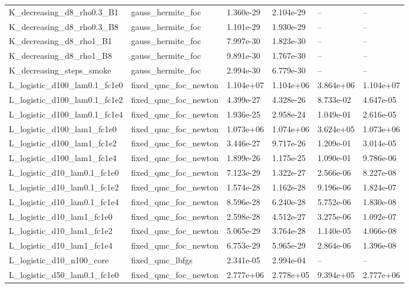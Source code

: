 \begin{tabular}{llllll}
K\_decreasing\_d8\_rho0.3\_B1 & gauss\_hermite\_foc & 1.360e-29 & 2.104e-29 & -- & -- \\
K\_decreasing\_d8\_rho0.3\_B8 & gauss\_hermite\_foc & 1.101e-29 & 1.930e-29 & -- & -- \\
K\_decreasing\_d8\_rho1\_B1 & gauss\_hermite\_foc & 7.997e-30 & 1.823e-30 & -- & -- \\
K\_decreasing\_d8\_rho1\_B8 & gauss\_hermite\_foc & 9.891e-30 & 1.767e-30 & -- & -- \\
K\_decreasing\_steps\_smoke & gauss\_hermite\_foc & 2.994e-30 & 6.779e-30 & -- & -- \\
L\_logistic\_d100\_lam0.1\_fc1e0 & fixed\_qmc\_foc\_newton & 1.104e+07 & 1.104e+06 & 3.864e+06 & 1.104e+07 \\
L\_logistic\_d100\_lam0.1\_fc1e2 & fixed\_qmc\_foc\_newton & 4.399e-27 & 4.328e-26 & 8.733e-02 & 4.647e-05 \\
L\_logistic\_d100\_lam0.1\_fc1e4 & fixed\_qmc\_foc\_newton & 1.936e-25 & 2.958e-24 & 1.049e-01 & 2.616e-05 \\
L\_logistic\_d100\_lam1\_fc1e0 & fixed\_qmc\_foc\_newton & 1.073e+06 & 1.074e+06 & 3.624e+05 & 1.073e+06 \\
L\_logistic\_d100\_lam1\_fc1e2 & fixed\_qmc\_foc\_newton & 3.446e-27 & 9.717e-26 & 1.209e-01 & 3.014e-05 \\
L\_logistic\_d100\_lam1\_fc1e4 & fixed\_qmc\_foc\_newton & 1.899e-26 & 1.175e-25 & 1.090e-01 & 9.786e-06 \\
L\_logistic\_d10\_lam0.1\_fc1e0 & fixed\_qmc\_foc\_newton & 7.123e-29 & 1.322e-27 & 2.566e-06 & 8.227e-08 \\
L\_logistic\_d10\_lam0.1\_fc1e2 & fixed\_qmc\_foc\_newton & 1.574e-28 & 1.162e-28 & 9.196e-06 & 1.824e-07 \\
L\_logistic\_d10\_lam0.1\_fc1e4 & fixed\_qmc\_foc\_newton & 8.596e-28 & 6.240e-28 & 5.752e-06 & 1.830e-08 \\
L\_logistic\_d10\_lam1\_fc1e0 & fixed\_qmc\_foc\_newton & 2.598e-28 & 4.512e-27 & 3.275e-06 & 1.092e-07 \\
L\_logistic\_d10\_lam1\_fc1e2 & fixed\_qmc\_foc\_newton & 5.065e-29 & 3.764e-28 & 1.140e-05 & 4.066e-08 \\
L\_logistic\_d10\_lam1\_fc1e4 & fixed\_qmc\_foc\_newton & 6.753e-29 & 5.965e-29 & 2.864e-06 & 1.396e-08 \\
L\_logistic\_d10\_n100\_core & fixed\_qmc\_lbfgs & 2.341e-05 & 2.994e-04 & -- & -- \\
L\_logistic\_d50\_lam0.1\_fc1e0 & fixed\_qmc\_foc\_newton & 2.777e+06 & 2.778e+05 & 9.394e+05 & 2.777e+06 \\

\end{tabular}
